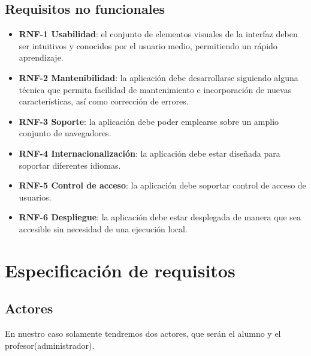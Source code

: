 \subsection{Requisitos no funcionales}
\begin{itemize}
	\item \textbf{RNF-1 Usabilidad}: el conjunto de elementos visuales de la interfaz deben ser intuitivos y conocidos por el usuario medio, permitiendo un rápido aprendizaje.
	\item \textbf{RNF-2 Mantenibilidad}: la aplicación debe desarrollarse siguiendo alguna técnica que permita facilidad de mantenimiento e incorporación de nuevas características, así como corrección de errores.
	\item \textbf{RNF-3 Soporte}: la aplicación debe poder emplearse sobre un amplio conjunto de navegadores.
	\item \textbf{RNF-4 Internacionalización}: la aplicación debe estar diseñada para soportar diferentes idiomas.
	\item \textbf{RNF-5 Control de acceso}: la aplicación debe soportar control de acceso de usuarios.
	\item \textbf{RNF-6 Despliegue}: la aplicación debe estar desplegada de manera que sea accesible sin necesidad de una ejecución local.
\end{itemize}

\section{Especificación de requisitos}

\subsection{Actores}
En nuestro caso solamente tendremos dos actores, que serán el alumno y el profesor(administrador).


